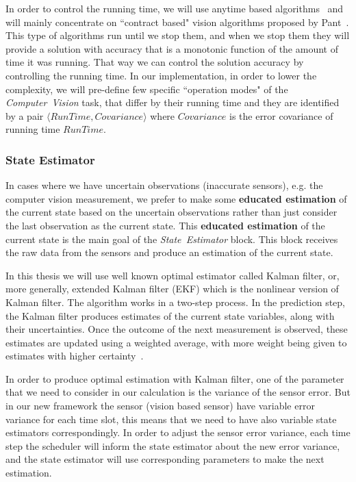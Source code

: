 \documentclass[11pt]{article}
\begin{document}
In order to control the running time, we will use anytime based algorithms~\cite{Shlomo} and will mainly concentrate on ``contract based" vision algorithms proposed by Pant~\cite{UPenn-Pant}.
This type of algorithms run until we stop them, and when we stop them they will provide a solution with accuracy that is a monotonic function of the amount of time it was running. That way we can control the solution accuracy by controlling the running time.
In our implementation, in order to lower the complexity, we will pre-define few specific ``operation modes" of the \textit{Computer~Vision} task, that differ by their running time and they are identified by a pair $\langle RunTime, Covariance \rangle$ where $Covariance$ is the error covariance of running time $RunTime$.

\subsubsection{State Estimator}
\label{sec:estimator}

In cases where we have uncertain observations (inaccurate sensors), e.g. the computer vision measurement, we prefer to make some \textbf{educated estimation} of the current state based on the uncertain observations rather than just consider the last observation as the current state.
This \textbf{educated estimation} of the current state is the main goal of the \textit{State~Estimator} block.
This block receives the raw data from the sensors and produce an estimation of the current state.

In this thesis we will use well known optimal estimator called Kalman filter, or, more generally, extended Kalman filter (EKF) which is the nonlinear version of Kalman filter.
The algorithm works in a two-step process. In the prediction step, the Kalman filter produces estimates of the current state variables, along with their uncertainties. Once the outcome of the next measurement is observed, these estimates are updated using a weighted average, with more weight being given to estimates with higher certainty~\cite{Kalman-filter}. 

In order to produce optimal estimation with Kalman filter, one of the parameter that we need to consider in our calculation is the variance of the sensor error.
But in our new framework the sensor (vision based sensor) have variable error variance for each time slot, this means that we need to have also variable state estimators correspondingly.
In order to adjust the sensor error variance, each time step the scheduler will inform the state estimator about the new error variance, and the state estimator will use corresponding parameters to make the next estimation.
\end{document}
